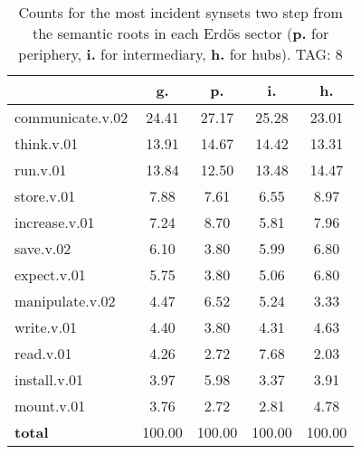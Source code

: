 \begin{table}[h!]
\begin{center}
\begin{tabular}{| l | c | c | c | c |}\hline
 & g. & p. & i. & h. \\\hline
communicate.v.02 & 24.41  & 27.17  & 25.28  & 23.01 \\\hline
think.v.01 & 13.91  & 14.67  & 14.42  & 13.31 \\\hline
run.v.01 & 13.84  & 12.50  & 13.48  & 14.47 \\\hline
store.v.01 & 7.88  & 7.61  & 6.55  & 8.97 \\\hline
increase.v.01 & 7.24  & 8.70  & 5.81  & 7.96 \\\hline
save.v.02 & 6.10  & 3.80  & 5.99  & 6.80 \\\hline
expect.v.01 & 5.75  & 3.80  & 5.06  & 6.80 \\\hline
manipulate.v.02 & 4.47  & 6.52  & 5.24  & 3.33 \\\hline
write.v.01 & 4.40  & 3.80  & 4.31  & 4.63 \\\hline
read.v.01 & 4.26  & 2.72  & 7.68  & 2.03 \\\hline
install.v.01 & 3.97  & 5.98  & 3.37  & 3.91 \\\hline
mount.v.01 & 3.76  & 2.72  & 2.81  & 4.78 \\\hline
{{\bf total}} & 100.00  & 100.00  & 100.00  & 100.00 \\\hline
\end{tabular}
\caption{Counts for the most incident synsets two step from the semantic roots in each Erd\"os sector ({\bf p.} for periphery, {\bf i.} for intermediary, {\bf h.} for hubs). TAG: 8}
\end{center}
\end{table}